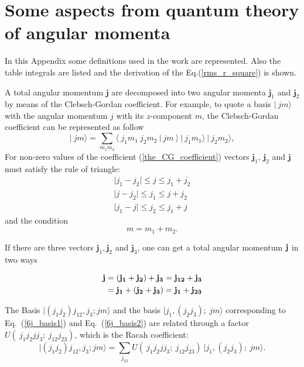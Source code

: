 
\chapter{Some aspects from quantum theory of angular momenta} %

\label{AppendixA} %
In this Appendix some definitions used in the work are represented.
Also the table integrals are listed and the derivation of the Eq.(\ref{rms_r_square}) is shown.

A total angular momentum $\mathbf{j}$ are decomposed into two angular momenta $\mathbf{j}_1$ and $\mathbf{j}_2$ by means of the Clebsch-Gordan coefficient. For example, to quote a basis $\vert ~ jm \rangle $ with the angular momentum $ j$ with its $z$-component $m$, the Clebsch-Gordan coefficient can be represented as follow
\begin{equation}
\label{the_CG_coefficient}
\vert ~ jm \rangle =\sum_{m_1 m_2} \langle ~ j_1 m_1~j_2 m_2~ \vert ~j m~  \rangle ~ \vert ~j_1 m_1 \rangle~ \vert ~j_2 m_2 \rangle,
\end{equation}
For non-zero values of the coefficient (\ref{the_CG_coefficient}) vectors $\mathbf{j}_1$, $\mathbf{j}_2$ and $\mathbf{j}$ must satisfy the rule of triangle:
\begin{align*}
\vert j_1 - j_2 \vert \leq j \leq j_1 + j_2 \\
\vert j - j_2 \vert \leq j_1 \leq j + j_2 \\ 
\vert j_1 - j \vert \leq j_2 \leq j_1 + j 
\end{align*}
and the condition
\begin{equation*}
m=m_1+m_2.
\end{equation*}


If there are three vectors $\mathbf{j}_1, \mathbf{j}_2$ and $\mathbf{j}_3$, one can get a total angular momentum $\bf j$ in two ways

\begin{align}
\label{6j_basis1}
\bf j & =\bf \left( j_1 + j_2 \right) + j_3 = j_{12} + j_3 \\
\label{6j_basis2}		
& = \bf j_1 + \left( j_2  + j_3 \right) = j_1 +j_{23}
\end{align}

The Basis $ \vert (j_1 j_2)j_{12},j_3; jm \rangle$ and the basis $\vert j_1,(j_2 j_3); ~jm \rangle$ corresponding to Eq.~(\ref{6j_basis1}) and Eq.~(\ref{6j_basis2}) are related through a factor $U(~j_1 j_2 j j_3;~ j_{12} j_{23})$, which is the Racah coefficient:
\begin{equation}
\vert (j_1 j_2)j_{12},j_3; jm \rangle = \sum_{j_{23}} U(~j_1 j_2 j j_3;~ j_{12} j_{23}) ~ \vert j_1,(j_2 j_3); ~jm \rangle.
\label{racah_U}
\end{equation}

